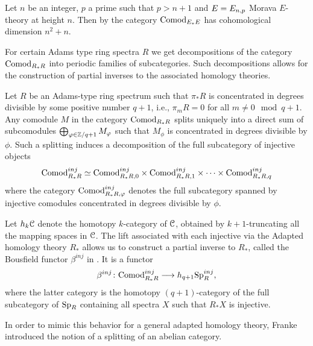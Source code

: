 \begin{example}
    \label{ch1:ex:cohomological-dimension-comodEE}
    Let $n$ be an integer, $p$ a prime such that $p>n+1$ and $E=E_{n,p}$ Morava $E$-theory at height $n$. Then by \cite[2.5]{pstragowski_2021} the category $\mathrm{Comod}_{E_*E}$ has cohomological dimension $n^2+n$. 
\end{example}

For certain Adams type ring spectra $R$ we get decompositions of the category $\mathrm{Comod}_{R_*R}$ into periodic families of subcategories. Such decompositions allows for the construction of partial inverses to the associated homology theories. 

\begin{construction}
    \label{ch1:const:splitting-of-comodules}
    Let $R$ be an Adams-type ring spectrum such that $\pi_*R$ is concentrated in degrees divisible by some positive number $q+1$, i.e., $\pi_m R = 0$ for all $m\neq 0 \mod q+1$. Any comodule $M$ in the category $\mathrm{Comod}_{R_*R}$ splits uniquely into a direct sum of subcomodules $\bigoplus_{\varphi \in \mathbb{Z}/q+1} M_\varphi$ such that $M_\phi$ is concentrated in degrees divisible by $\phi$. Such a splitting induces a decomposition of the full subcategory of injective objects 
    $$\mathrm{Comod}_{R_*R}^{inj} \simeq \mathrm{Comod}_{R_*R, 0}^{inj}\times \mathrm{Comod}_{R_*R, 1}^{inj}\times \cdots \times \mathrm{Comod}_{R_*R, q}^{inj}$$ 
    where the category $\mathrm{Comod}_{R_*R, \varphi}^{inj}$ denotes the full subcategory spanned by injective comodules concentrated in degrees divisible by $\phi$. 
    
    Let $h_k \EuScript{C}$ denote the homotopy $k$-category of $\EuScript{C}$, obtained by $k+1$-truncating all the mapping spaces in $\EuScript{C}$.  
    The lift associated with each injective via the Adapted homology theory $R_*$ allows us to construct a partial inverse to $R_*$, called the Bousfield functor $\beta^{inj}$ in \cite{patchkoria-pstragowski_2021}. It is a functor 
    \[\beta^{inj}\colon \mathrm{Comod}_{R_*R}^{inj}\longrightarrow h_{q+1} \mathrm{Sp}_R^{inj},\]
    where the latter category is the homotopy $(q+1)$-category of the full subcategory of $\mathrm{Sp}_R$ containing all spectra $X$ such that $R_*X$ is injective. %
\end{construction}
    
In order to mimic this behavior for a general adapted homology theory, Franke introduced the notion of a splitting of an abelian category. 
    
